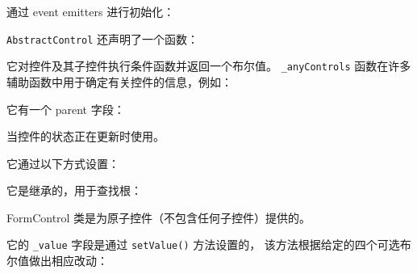 通过 event emitters 进行初始化：




\texttt{AbstractControl} 还声明了一个函数：




它对控件及其子控件执行条件函数并返回一个布尔值。
\texttt{\_anyControls} 函数在许多辅助函数中用于确定有关控件的信息，例如：




它有一个 parent 字段：




当控件的状态正在更新时使用。




它通过以下方式设置：




它是继承的，用于查找根：




FormControl 类是为原子控件（不包含任何子控件）提供的。




它的 \texttt{\_value} 字段是通过 \texttt{setValue()} 方法设置的，
该方法根据给定的四个可选布尔值做出相应改动：

